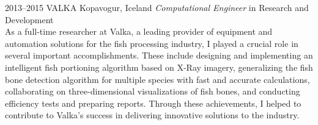 \documentclass[]{cv} %
\begin{document}
\begin{entrylist}
\entry
{2013--2015}
{VALKA}
{Kopavogur, Iceland}
{\emph{Computational Engineer} in Research and Development \\
As a full-time researcher at Valka, a leading provider of equipment and automation solutions for the fish processing industry, I played a crucial role in several important accomplishments. These include designing and implementing an intelligent fish portioning algorithm based on X-Ray imagery, generalizing the fish bone detection algorithm for multiple species with fast and accurate calculations, collaborating on three-dimensional visualizations of fish bones, and conducting efficiency tests and preparing reports. Through these achievements, I helped to contribute to Valka's success in delivering innovative solutions to the industry.
}
\end{entrylist}
\end{document}
